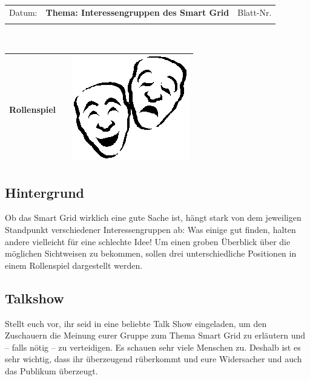 \documentclass[11pt,a4paper,DIV=10,BCOR=0mm]{scrartcl}
\begin{document}
%
\setlength{\tabcolsep}{3mm} %
\noindent
\begin{tabularx}{\textwidth}{|l|T|l|}
\hline
Datum: & \rule{0pt}{5mm} \textbf{\textsf{Thema: Interessengruppen des Smart Grid}} & Blatt-Nr. \\
&&\\ 
\hline
\end{tabularx}
\rule{0pt}{3mm} \\
\setlength{\tabcolsep}{0mm} %
\begin{tabularx}{\linewidth}{lXr}
{\Large\textsf{\textbf{Rollenspiel}}} & &
\includegraphics[scale=0.25]{images/rollenspiel}\\  %
\hline
\end{tabularx}
\subsection*{Hintergrund}
Ob %
das Smart Grid wirklich eine gute Sache ist, hängt stark von dem jeweiligen Standpunkt
verschiedener Interessengruppen ab: Was einige gut finden, halten andere vielleicht für eine
schlechte Idee! Um einen groben Überblick über die möglichen Sichtweisen zu bekommen,
sollen drei unterschiedliche Positionen in einem Rollenspiel dargestellt werden.
\subsection*{Talkshow}
Stellt euch vor, ihr seid in eine beliebte Talk Show eingeladen, um den Zu\-schau\-ern
die Meinung eurer Gruppe zum Thema Smart Grid zu erläutern und -- falls nötig -- zu verteidigen. Es schauen sehr viele Menschen zu. Deshalb ist es sehr wichtig, dass ihr überzeugend rüberkommt und eure Widersacher und auch das Publikum überzeugt.
\end{document}
